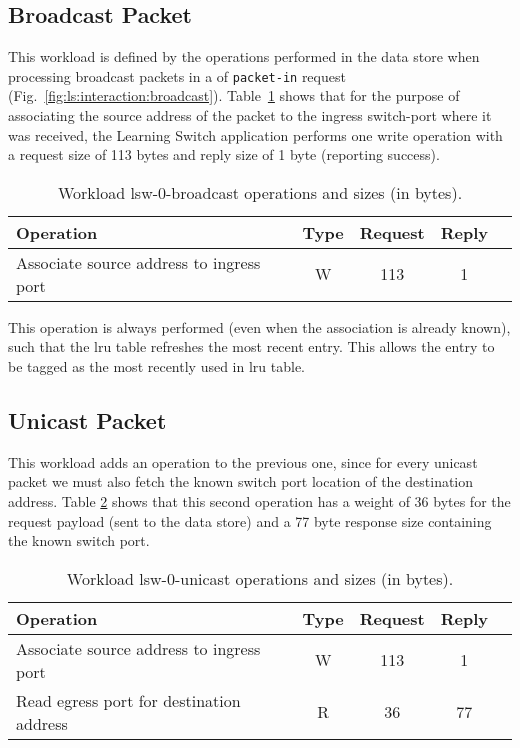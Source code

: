 \subsection{Broadcast Packet}
This workload is defined by  the operations performed in the data store when processing broadcast packets in a \acrfull{of} \texttt{packet-in} request (Fig.~\ref{fig:ls:interaction:broadcast}). Table~\ref{table:lsw0:broadcast} shows that for the purpose of associating the source address of the packet to the ingress switch-port where it was received, the Learning Switch application performs one write operation with a request size of 113 bytes and reply size of 1 byte (reporting success). 

\begin{table}[ht]
\small
\centering 
\begin{tabular}{l c c c c}
 Operation & Type & Request & Reply \\ \toprule 
 Associate source address to ingress port & W & 113 & 1 \\ \bottomrule
\end{tabular}
\caption[Workload lsw-0-broadcast operations]{Workload lsw-0-broadcast operations and sizes (in bytes).}
\label{table:lsw0:broadcast}
\end{table}


This operation is always performed (even when the association is already known), such that the \gls{lru} table refreshes the most recent entry.
This allows the entry to be tagged as the most recently used in \gls{lru} table. 
\subsection{Unicast Packet}
This workload adds an operation to the previous one, since for every unicast packet we must also fetch the known switch port location of the destination address. Table \ref{table:lsw0:unicast} shows that this second operation has a weight of 36 bytes for the request payload (sent to the data store) and a 77 byte response size containing the known switch port.  

\begin{table}[ht]
\small
\centering 
\begin{tabular}{l c c c c}
 Operation & Type & Request & Reply  \\ \toprule 
Associate source address to ingress port & W & 113 & 1\\
Read egress port for destination address & R & 36 & 77 \\ \bottomrule
\end{tabular}
\caption[Workload lsw-0-unicast operations]{Workload lsw-0-unicast operations and sizes (in bytes).}
\label{table:lsw0:unicast}
\end{table}


